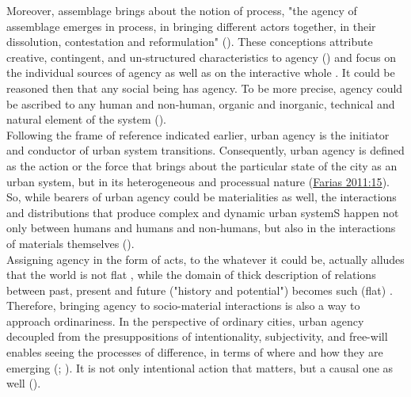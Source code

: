\documentclass[11pt]{report}
\begin{document}
{{{Moreover, assemblage brings about the notion of process, "the agency of assemblage emerges in process, in bringing different actors together, in their dissolution,  contestation  and  reformulation"
(\href{McFarlane}{\citealt{mcfarlane_assemblage_2011}}).
These conceptions attribute creative, contingent, and un-structured characteristics to agency (\href{Rafiee}{\citealt{rafiee_relationship_2014}}) and focus on the individual sources of agency as well as on the interactive whole \href{McFarlane}{\citealt{mcfarlane_assemblage_2011}}.
It could be reasoned then that any social being has agency. To be more precise, agency could be ascribed to any human and non-human, organic and inorganic, technical and natural element of the system (\href{Anderson}{\citealt{anderson_assemblage_2011}}).
\\

Following the frame of reference indicated earlier, urban agency is the initiator and conductor of urban system transitions. Consequently, urban agency is defined as the action or the force that brings about the particular state of the city as an urban system, but in its heterogeneous and processual nature (\href{Farias}{Farias 2011:15}). 
So, while bearers of urban agency could be materialities as well, the interactions and distributions that produce complex and dynamic urban systemS happen not only between humans and humans and non-humans, but also in the interactions of materials themselves (\href{De Landa}{\citealt{Manuel De Landa 2000}}).
\\

Assigning agency in the form of acts, to the whatever it could be, actually alludes that the world is not flat  \href{Roy}{\citealt{roy_21st-century_2009}}, while the domain of thick description of relations between past, present and future ("history and potential") becomes such (flat) \href{Rankin}{\citealt{rankin_assemblage_2011}}.
Therefore, bringing agency to socio-material interactions is also a way to approach ordinariness. In the perspective of ordinary cities, urban agency decoupled from the presuppositions of intentionality, subjectivity, and free-will enables seeing the processes of difference, in terms of where and how they are emerging (\href{Sayes}{\citealt{sayes_actor-network_2014}}; \href{McFarlane}{\citealt{mcfarlane_assemblage_2011}}).
It is not only intentional action that matters, but a causal one as well  
(\href{Sayes}{\citealt{sayes_actor-network_2014}}).
\\

}}}
\end{document}
